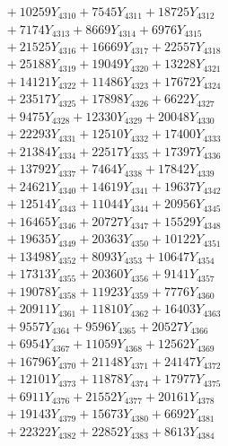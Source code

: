 \documentclass[a4paper,10pt]{article}
\begin{document}
{\begin{align}
&\;  + 10259 Y_{4310} + 7545 Y_{4311} + 18725 Y_{4312} \\[0.3ex]
&\;  + 7174 Y_{4313} + 8669 Y_{4314} + 6976 Y_{4315} \\[0.3ex]
&\;  + 21525 Y_{4316} + 16669 Y_{4317} + 22557 Y_{4318} \\[0.5ex]\allowbreak
&\;  + 25188 Y_{4319} + 19049 Y_{4320} + 13228 Y_{4321} \\[0.3ex]
&\;  + 14121 Y_{4322} + 11486 Y_{4323} + 17672 Y_{4324} \\[0.3ex]
&\;  + 23517 Y_{4325} + 17898 Y_{4326} + 6622 Y_{4327} \\[0.3ex]
&\;  + 9475 Y_{4328} + 12330 Y_{4329} + 20048 Y_{4330} \\[0.3ex]
&\;  + 22293 Y_{4331} + 12510 Y_{4332} + 17400 Y_{4333} \\[0.3ex]
&\;  + 21384 Y_{4334} + 22517 Y_{4335} + 17397 Y_{4336} \\[0.3ex]
&\;  + 13792 Y_{4337} + 7464 Y_{4338} + 17842 Y_{4339} \\[0.3ex]
&\;  + 24621 Y_{4340} + 14619 Y_{4341} + 19637 Y_{4342} \\[0.3ex]
&\;  + 12514 Y_{4343} + 11044 Y_{4344} + 20956 Y_{4345} \\[0.3ex]
&\;  + 16465 Y_{4346} + 20727 Y_{4347} + 15529 Y_{4348} \\[0.5ex]\allowbreak
&\;  + 19635 Y_{4349} + 20363 Y_{4350} + 10122 Y_{4351} \\[0.3ex]
&\;  + 13498 Y_{4352} + 8093 Y_{4353} + 10647 Y_{4354} \\[0.3ex]
&\;  + 17313 Y_{4355} + 20360 Y_{4356} + 9141 Y_{4357} \\[0.3ex]
&\;  + 19078 Y_{4358} + 11923 Y_{4359} + 7776 Y_{4360} \\[0.3ex]
&\;  + 20911 Y_{4361} + 11810 Y_{4362} + 16403 Y_{4363} \\[0.3ex]
&\;  + 9557 Y_{4364} + 9596 Y_{4365} + 20527 Y_{4366} \\[0.3ex]
&\;  + 6954 Y_{4367} + 11059 Y_{4368} + 12562 Y_{4369} \\[0.3ex]
&\;  + 16796 Y_{4370} + 21148 Y_{4371} + 24147 Y_{4372} \\[0.3ex]
&\;  + 12101 Y_{4373} + 11878 Y_{4374} + 17977 Y_{4375} \\[0.3ex]
&\;  + 6911 Y_{4376} + 21552 Y_{4377} + 20161 Y_{4378} \\[0.5ex]\allowbreak
&\;  + 19143 Y_{4379} + 15673 Y_{4380} + 6692 Y_{4381} \\[0.3ex]
&\;  + 22322 Y_{4382} + 22852 Y_{4383} + 8613 Y_{4384} \\[0.3ex]

\end{align}}
\end{document}
